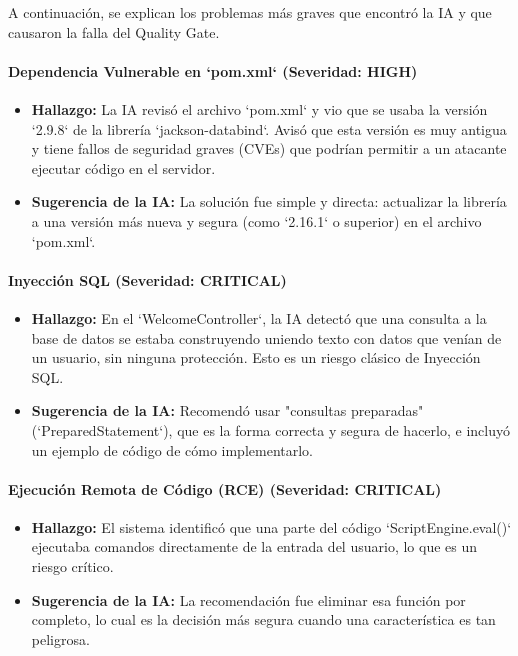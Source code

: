 A continuación, se explican los problemas más graves que encontró la IA y que causaron la falla del Quality Gate.

\paragraph{Dependencia Vulnerable en `pom.xml` (Severidad: HIGH)}
\begin{itemize}
    \item \textbf{Hallazgo:} La IA revisó el archivo `pom.xml` y vio que se usaba la versión `2.9.8` de la librería `jackson-databind`. Avisó que esta versión es muy antigua y tiene fallos de seguridad graves (CVEs) que podrían permitir a un atacante ejecutar código en el servidor.
    \item \textbf{Sugerencia de la IA:} La solución fue simple y directa: actualizar la librería a una versión más nueva y segura (como `2.16.1` o superior) en el archivo `pom.xml`.
\end{itemize}

\paragraph{Inyección SQL (Severidad: CRITICAL)}
\begin{itemize}
    \item \textbf{Hallazgo:} En el `WelcomeController`, la IA detectó que una consulta a la base de datos se estaba construyendo uniendo texto con datos que venían de un usuario, sin ninguna protección. Esto es un riesgo clásico de Inyección SQL.
    \item \textbf{Sugerencia de la IA:} Recomendó usar "consultas preparadas" (`PreparedStatement`), que es la forma correcta y segura de hacerlo, e incluyó un ejemplo de código de cómo implementarlo.
\end{itemize}

\paragraph{Ejecución Remota de Código (RCE) (Severidad: CRITICAL)}
\begin{itemize}
    \item \textbf{Hallazgo:} El sistema identificó que una parte del código `ScriptEngine.eval()` ejecutaba comandos directamente de la entrada del usuario, lo que es un riesgo crítico.
    \item \textbf{Sugerencia de la IA:} La recomendación fue eliminar esa función por completo, lo cual es la decisión más segura cuando una característica es tan peligrosa.
\end{itemize}


